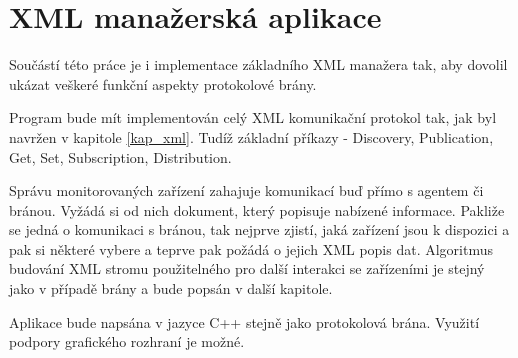 \section{XML manažerská aplikace}
Součástí této práce je i implementace základního XML manažera tak, aby dovolil ukázat veškeré funkční aspekty protokolové brány.

Program bude mít implementován celý XML komunikační protokol tak, jak byl navržen v kapitole \ref{kap_xml}. Tudíž základní příkazy - Discovery, Publication, Get, Set, Subscription, Distribution.

Správu monitorovaných zařízení zahajuje komunikací buď přímo s agentem či bránou. Vyžádá si od nich 
dokument, který popisuje nabízené informace. Pakliže se jedná o komunikaci s bránou, tak nejprve zjistí, jaká zařízení jsou k dispozici a pak si některé vybere a teprve pak požádá o jejich XML popis dat.
Algoritmus budování XML stromu použitelného pro další interakci se zařízeními je stejný jako v případě brány a bude popsán v další kapitole. 

Aplikace bude napsána v jazyce C++ stejně jako protokolová brána. Využití podpory grafického rozhraní je možné.







